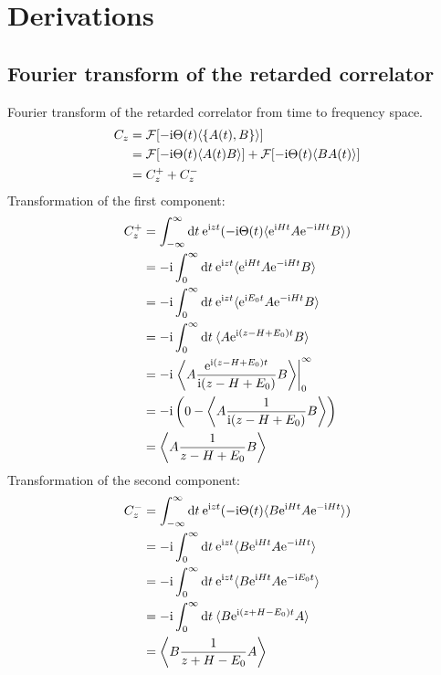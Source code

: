 
\chapter{Derivations}

\section{Fourier transform of the retarded correlator}
\label{app:fourier-transform}

Fourier transform of the retarded correlator from time to frequency space.
\begin{align}
    C_z
     & =
    \mathcal{F}[-\mathrm{i} \Theta(t) \langle \{A(t), B\}\rangle] \\
     & =
    \mathcal{F}[-\mathrm{i} \Theta(t) \langle A(t) B\rangle]
    +
    \mathcal{F}[-\mathrm{i} \Theta(t) \langle B A(t)\rangle]      \\
     & =
    C^+_z + C^-_z
\end{align}
Transformation of the first component:
\begin{align}
    C^+_z
     & =
    \int_{-\infty}^\infty \mathrm{d} t \>
    \mathrm{e}^{\mathrm{i} zt}(-\mathrm{i} \Theta(t) \langle \mathrm{e}^{\mathrm{i} Ht} A \mathrm{e}^{-\mathrm{i} Ht} B\rangle)     \\
     & =
    -\mathrm{i} \int_0^\infty \mathrm{d} t \>
    \mathrm{e}^{\mathrm{i} zt} \langle \mathrm{e}^{\mathrm{i} Ht} A \mathrm{e}^{-\mathrm{i} Ht} B\rangle                     \\
     & =
    -\mathrm{i} \int_0^\infty \mathrm{d} t \>
    \mathrm{e}^{\mathrm{i} zt} \langle \mathrm{e}^{\mathrm{i} E_0t} A \mathrm{e}^{-\mathrm{i} Ht} B\rangle                   \\
     & =
    -\mathrm{i} \int_0^\infty \mathrm{d} t \>
    \langle A \mathrm{e}^{\mathrm{i}(z - H + E_0)t} B\rangle                                     \\
     & =
    -\mathrm{i} \left.\left\langle A \frac{\mathrm{e}^{\mathrm{i}(z - H + E_0)t}}{\mathrm{i}(z - H + E_0)} B\right\rangle
    \right|_0^\infty                                                               \\
     & =
    -\mathrm{i} \left(0 - \left\langle A \frac{1}{\mathrm{i}(z - H + E_0)} B\right\rangle\right) \\
     & =
    \left\langle A \frac{1}{z - H + E_0} B\right\rangle
\end{align}
Transformation of the second component:
\begin{align}
    C^-_z
     & =
    \int_{-\infty}^\infty \mathrm{d} t \>
    \mathrm{e}^{\mathrm{i} zt}(-\mathrm{i} \Theta(t) \langle B \mathrm{e}^{\mathrm{i} Ht} A \mathrm{e}^{-\mathrm{i} Ht}\rangle) \\
     & =
    -\mathrm{i} \int_0^\infty \mathrm{d} t \>
    \mathrm{e}^{\mathrm{i} zt} \langle B \mathrm{e}^{\mathrm{i} Ht} A \mathrm{e}^{-\mathrm{i} Ht}\rangle                 \\
     & =
    -\mathrm{i} \int_0^\infty \mathrm{d} t \>
    \mathrm{e}^{\mathrm{i} zt} \langle B \mathrm{e}^{\mathrm{i} Ht} A \mathrm{e}^{-\mathrm{i} E_0t}\rangle               \\
     & =
    -\mathrm{i} \int_0^\infty \mathrm{d} t \>
    \langle B \mathrm{e}^{\mathrm{i}(z + H - E_0)t} A\rangle                                 \\
     & =
    \left\langle B \frac{1}{z + H - E_0} A\right\rangle
\end{align}

